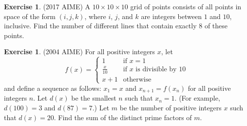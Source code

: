 \documentclass[letterpaper]{article}
\theoremstyle{remark}
\theoremstyle{definition}
\newtheorem{exercise}[thm]{Exercise}
\begin{document}
\begin{exercise}
(2017 AIME) A $10\times 10\times 10$ grid of points consists of all points in space of the form $(i,j,k)$, where $i$, $j$, and $k$ are integers between $1$ and $10$, inclusive. Find the number of different lines that contain exactly $8$ of these points.
\end{exercise}

\begin{exercise}
(2004 AIME) For all positive integers $ x$, let
\[ f(x) = \begin{cases}1 & \text{if }x = 1 \\
\frac x{10} & \text{if }x\text{ is divisible by 10} \\
x + 1 & \text{otherwise}\end{cases}\]and define a sequence as follows: $ x_1 = x$ and $ x_{n + 1} = f(x_n)$ for all positive integers $ n$. Let $ d(x)$ be the smallest $ n$ such that $ x_n = 1$. (For example, $ d(100) = 3$ and $ d(87) = 7$.) Let $ m$ be the number of positive integers $ x$ such that $ d(x) = 20$. Find the sum of the distinct prime factors of $ m$.
\end{exercise}
\end{document}
